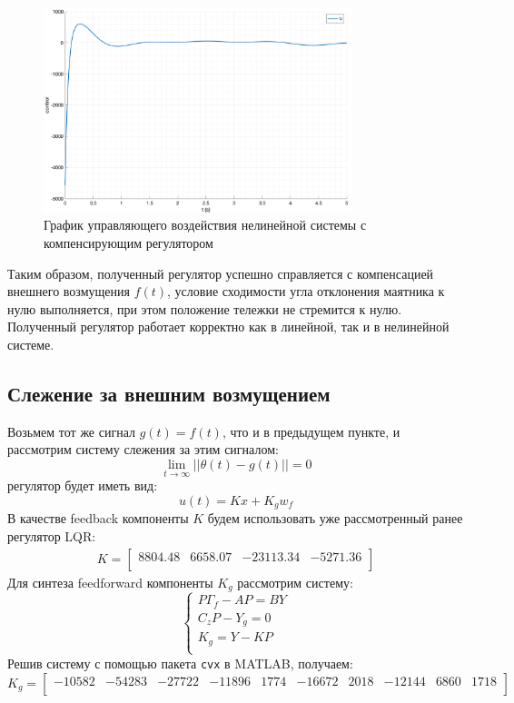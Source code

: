 \begin{figure}[ht!]
    \centering
    \includegraphics[width=0.8\textwidth]{media/plots/compensation/u_1.png}
    \caption{График управляющего воздействия нелинейной системы с компенсирующим регулятором}
    \label{fig:compensation_nlin_control}
\end{figure}
\FloatBarrier
Таким образом, полученный регулятор успешно справляется с компенсацией внешнего возмущения $f(t)$,
условие сходимости угла отклонения маятника к нулю выполняется, при этом положение тележки не стремится к нулю.
Полученный регулятор работает корректно как в линейной, так и в нелинейной системе. 

\subsection{Слежение за внешним возмущением}
Возьмем тот же сигнал $g(t) = f(t)$, что и в предыдущем пункте, и рассмотрим систему слежения за этим сигналом:  
\begin{equation}
    \lim_{t\to\infty} ||\theta(t) - g(t)|| = 0
\end{equation}
регулятор будет иметь вид:
\begin{equation}
    u(t) = Kx + K_g w_f
\end{equation}
В качестве feedback компоненты $K$ будем использовать уже рассмотренный ранее регулятор LQR: 
\begin{eqnarray}
    K = \begin{bmatrix}
        8804.48  & 6658.07  & -23113.34  & -5271.36 \\ 
    \end{bmatrix}
\end{eqnarray}
Для синтеза feedforward компоненты $K_g$ рассмотрим систему:
\begin{equation}
    \begin{cases}
        P\Gamma_f - AP = BY \\
        C_z P - Y_g = 0 \\
        K_g = Y - K P \\
    \end{cases}
\end{equation}
Решив систему с помощью пакета \texttt{cvx} в MATLAB, получаем:
\begin{equation}
    K_g = \begin{bmatrix}
        -10582  & -54283  & -27722  & -11896  & 1774  & -16672  & 2018  & -12144  & 6860  & 1718 \\ 
    \end{bmatrix}
\end{equation}
